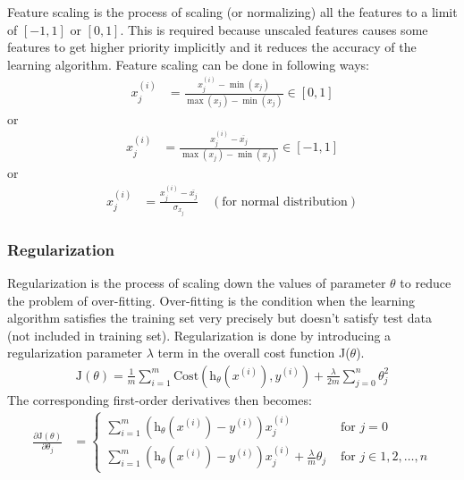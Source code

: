 Feature scaling is the process of scaling (or normalizing) all the features
to a limit of $[-1,1]$ or $[0,1]$. This is required because unscaled features
causes some features to get higher priority implicitly and it reduces
the accuracy of the learning algorithm. Feature scaling can be done in following
ways:
\begin{align}
  x_j^{(i)} &= \frac{x_j^{(i)} - \min (x_j)}{ \max (x_j) - \min (x_j)}
  \in [0, 1]
  \nonumber
\end{align}
or
\begin{align}
  x_j^{(i)} &= \frac{x_j^{(i)} - \overline{x_j}}{ \max (x_j) - \min (x_j)}
  \in [-1, 1]
  \nonumber
\end{align}
or
\begin{align}
  x_j^{(i)} &= \frac{x_j^{(i)} - \overline{x_j}}{\sigma_{x_j}}
  \quad (\text{for normal distribution})
  \nonumber
\end{align}


\subsubsection{Regularization}

Regularization is the process of scaling down the values of parameter $\theta$
to reduce the problem of over-fitting. Over-fitting is the condition when
the learning algorithm satisfies the training set very precisely but doesn't
satisfy test data (not included in training set). Regularization is done
by introducing a regularization parameter $\lambda$ term in the overall
cost function J($\theta$).
\begin{align}
  \text{J}(\theta) = \frac{1}{m} \sum_{i=1}^{m}
  \text{Cost} \left( \text{h}_\theta \left(x^{(i)} \right), y^{(i)} \right)
  + \frac{\lambda}{2m} \sum_{j=0}^n \theta_j^2
  \label{eqn:j-with-l}
\end{align}
The corresponding first-order derivatives then becomes:
\begin{align}
  \frac{\partial \text{J}(\theta)}{\partial \theta_j} &=
  \begin{cases}
    \displaystyle
    \sum_{i=1}^{m} \left( \text{h}_\theta \left(x^{(i)}\right) - y^{(i)} \right) x^{(i)}_j
    &\text{ for } j = 0\\
    \displaystyle
    \sum_{i=1}^{m} \left( \text{h}_\theta \left(x^{(i)}\right) - y^{(i)} \right) x^{(i)}_j
    + \frac{\lambda}{m} \theta_j
    &\text{ for } j \in {1,2,\ldots,n}
  \end{cases}
  \nonumber
\end{align}
